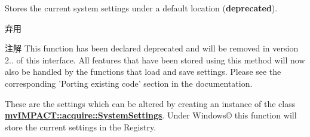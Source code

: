 Stores the current system settings under a default location ({\bfseries deprecated}). 

\begin{DoxyRefDesc}{弃用}
\item[\hyperlink{deprecated__deprecated000019}{弃用}]\end{DoxyRefDesc}
\begin{DoxyNote}{注解}
This function has been declared deprecated and will be removed in version 2.. of this interface. All features that have been stored using this method will now also be handled by the functions that load and save settings. Please see the corresponding 'Porting existing code' section in the documentation.
\end{DoxyNote}
These are the settings which can be altered by creating an instance of the class {\bfseries \hyperlink{classmv_i_m_p_a_c_t_1_1acquire_1_1_system_settings}{mv\+I\+M\+P\+A\+C\+T\+::acquire\+::\+System\+Settings}}. Under Windows\copyright{} this function will store the current settings in the Registry.

